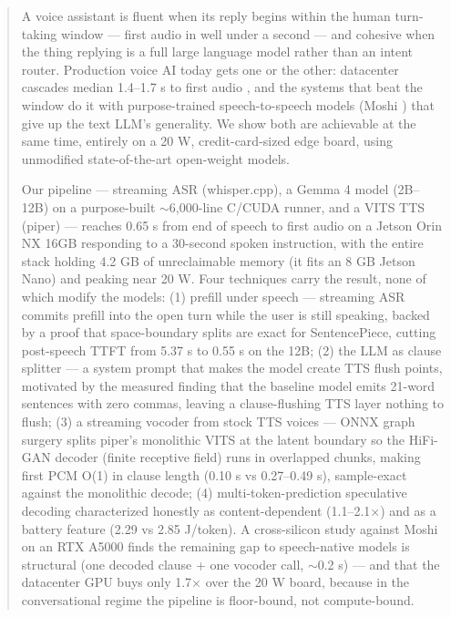 \documentclass[journal]{IEEEtran}
\begin{document}
\begin{abstract}
A voice assistant is fluent when its reply begins within the human turn-taking window — first audio in well under a second — and cohesive when the thing replying is a full large language model rather than an intent router. Production voice AI today gets one or the other: datacenter cascades median 1.4–1.7 s to first audio \cite{sharma2026latency,hamming2026metrics}, and the systems that beat the window do it with purpose-trained speech-to-speech models (Moshi \cite{defossez2024moshi}) that give up the text LLM's generality. We show both are achievable at the same time, entirely on a 20 W, credit-card-sized edge board, using unmodified state-of-the-art open-weight models.

Our pipeline — streaming ASR (whisper.cpp), a Gemma 4 model (2B–12B) on a purpose-built $\sim$6,000-line C/CUDA runner, and a VITS TTS (piper) — reaches 0.65 s from end of speech to first audio on a Jetson Orin NX 16GB responding to a 30-second spoken instruction, with the entire stack holding 4.2 GB of unreclaimable memory (it fits an 8 GB Jetson Nano) and peaking near 20 W. Four techniques carry the result, none of which modify the models: (1) prefill under speech — streaming ASR commits prefill into the open turn while the user is still speaking, backed by a proof that space-boundary splits are exact for SentencePiece, cutting post-speech TTFT from 5.37 s to 0.55 s on the 12B; (2) the LLM as clause splitter — a system prompt that makes the model create TTS flush points, motivated by the measured finding that the baseline model emits 21-word sentences with zero commas, leaving a clause-flushing TTS layer nothing to flush; (3) a streaming vocoder from stock TTS voices — ONNX graph surgery splits piper's monolithic VITS at the latent boundary so the HiFi-GAN decoder (finite receptive field) runs in overlapped chunks, making first PCM O(1) in clause length (0.10 s vs 0.27–0.49 s), sample-exact against the monolithic decode; (4) multi-token-prediction speculative decoding characterized honestly as content-dependent (1.1–2.1×) and as a battery feature (2.29 vs 2.85 J/token). A cross-silicon study against Moshi on an RTX A5000 finds the remaining gap to speech-native models is structural (one decoded clause + one vocoder call, $\sim$0.2 s) — and that the datacenter GPU buys only 1.7× over the 20 W board, because in the conversational regime the pipeline is floor-bound, not compute-bound.
\end{abstract}
\end{document}
